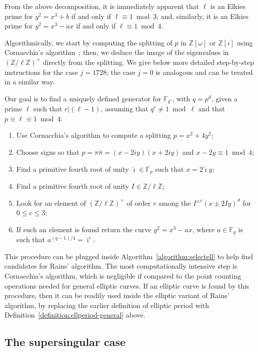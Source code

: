 \documentclass[12pt]{article}
\theoremstyle{plain}
\theoremstyle{definition}
\def\Z{\ensuremath{\mathbb{Z}}}
\def\F{\ensuremath{\mathbb{F}}}
\newcounter{algorithm}
\begin{document}
From the above decomposition, it is immediately apparent that $\ell$
is an Elkies prime for $y^2=x^3+b$ if and only if
$\ell\equiv 1 \bmod 3$; and, similarly, it is an Elkies prime for
$y^2=x^3-ax$ if and only if $\ell\equiv 1 \bmod 4$. %

Algorithmically, we start by computing the splitting of $p$ in
$\Z[\omega]$ or $\Z[i]$ using Cornacchia's
algorithm~\cite{cornacchia1908di}; then, we deduce the image of the
eigenvalues in $(\Z/\ell\Z)^\times$ directly from the splitting. %
We give below more detailed step-by-step instructions for the case
$j=1728$; the case $j=0$ is analogous and can be treated in a similar
way.

Our goal is to find a uniquely defined generator for $\F_{q^r}$, with
$q=p^d$, given a prime $\ell$ such that $r|(\ell-1)$, assuming that
$q^r\ne 1\bmod\ell$ and that $p\equiv\ell\equiv 1 \bmod 4$:
\begin{enumerate}
\item Use Cornacchia's algorithm to compute a splitting $p=x^2+4y^2$;
\item Choose signs so that $p=\pi\bar\pi=(x-2iy)(x+2iy)$ and
  $x - 2y \equiv 1 \bmod 4$;
\item Find a primitive fourth root of unity $\hat\imath\in\F_p$ such that
  $x=2\hat\imath y$;
\item Find a primitive fourth root of unity $I\in\Z/\ell\Z$;
\item Look for an element of $(\Z/\ell\Z)^\times$ of order $r$ among
  the $I^{\pm c}(x\pm2Iy)^d$ for $0\le c \le 3$;
\item If such an element is found return the curve $y^2=x^3-ax$, where
  $a\in\F_q$ is such that $a^{(q-1)/4}=\hat\imath^c$.
\end{enumerate}

This procedure can be plugged inside
Algorithm~\ref{algorithm:selectell} to help find candidates for Rains'
algorithm. %
The most computationally intensive step is Cornacchia's algorithm,
which is negligible if compared to the point counting operations
needed for general elliptic curves. %
If an elliptic curve is found by this procedure, then it can be
readily used inside the elliptic variant of Rains' algorithm, by
replacing the earlier definition of elliptic period with
Definition~\ref{definition:ellperiod-general} above.


\subsection{The supersingular case}
\end{document}
